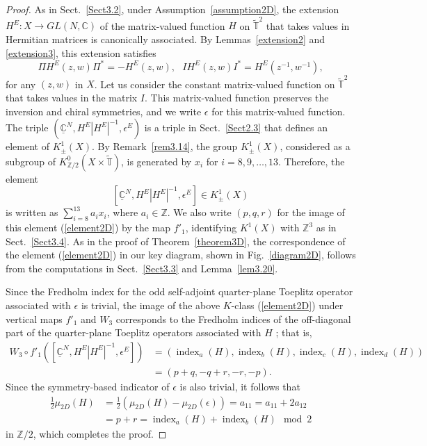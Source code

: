 \documentclass{amsart}
\theoremstyle{plain}
\theoremstyle{definition}
\theoremstyle{remark}
\newcommand{\Z}{\mathbb{Z}}
\newcommand{\C}{\mathbb{C}}
\newcommand{\T}{\mathbb{T}}
\newcommand{\tT}{\widetilde{\T}}
\newcommand{\uC}{\underline{\C}}
\DeclareMathOperator{\ind}{\mathrm{index}}
\begin{document}
\begin{proof}
As in Sect.~\ref{Sect3.2}, under Assumption~\ref{assumption2D}, the extension
$H^E \colon X \to GL(N,\C)$ of the matrix-valued function $H$ on $\tT^2$ that takes values in Hermitian matrices is canonically associated.
By Lemmas~\ref{extension2} and \ref{extension3}, this extension satisfies
\begin{equation*}
	\Pi H^E(z,w) \Pi^* = - H^E(z,w), \ \ \
	I H^E(z,w) I^* = H^E(z^{-1}, w^{-1}),
\end{equation*}
for any $(z,w)$ in $X$.
Let us consider the constant matrix-valued function on $\tT^2$ that takes values in the matrix $I$.
This matrix-valued function preserves the inversion and chiral symmetries, and we write $\epsilon$ for this matrix-valued function.
The triple $(\uC^N, H^E|H^E|^{-1}, \epsilon^E)$ is a triple in Sect.~\ref{Sect2.3} that defines an element of $K^1_\pm(X)$.
By Remark~\ref{rem3.14}, the group $K^1_\pm(X)$, considered as a subgroup of $K^0_{\Z/2}(X \times \tT)$, is generated by $x_i$ for $i=8,9,\ldots,13$.
Therefore, the element
\begin{equation}
\label{element2D}
	[\uC^N, H^E|H^E|^{-1}, \epsilon^E] \in K^1_\pm(X)
\end{equation}
is written as $\sum_{i=8}^{13}a_i x_i$, where $a_i \in \Z$.
We also write $(p,q,r)$ for the image of this element (\ref{element2D}) by the map $f'_1$, identifying $K^1(X)$ with $\Z^3$ as in Sect.~\ref{Sect3.4}.
As in the proof of Theorem~\ref{theorem3D}, the correspondence of the element (\ref{element2D}) in our key diagram, shown in Fig.~\ref{diagram2D}, follows from the computations in Sect.~\ref{Sect3.3} and Lemma~\ref{lem3.20}.

Since the Fredholm index for the odd self-adjoint quarter-plane Toeplitz operator associated with $\epsilon$ is trivial,
the image of the above $K$-class (\ref{element2D}) under vertical maps $f'_1$ and $W_3$ corresponds to the Fredholm indices of the off-diagonal part of the quarter-plane Toeplitz operators associated with $H$ \cite{Hayashi5}; that is,
\begin{align*}
	W_3 \circ f'_1 ([\uC^N, H^E|H^E|^{-1}, \epsilon^E]) &= (\ind_a(H), \ind_b(H), \ind_c(H), \ind_d(H))\\
	&= (p+q, -q+r, -r, -p).
\end{align*}
Since the symmetry-based indicator of $\epsilon$ is also trivial, it follows that
\begin{align*}
	\frac{1}{2}\mu_{2D}(H) &= \frac{1}{2}( \mu_{2D}(H) - \mu_{2D}(\epsilon)) = a_{11} = a_{11} + 2a_{12}\\
		&= p+r = \ind_a(H) + \ind_b(H) \mod 2
\end{align*}
in $\Z/2$, which completes the proof.
\end{proof}
\end{document}
